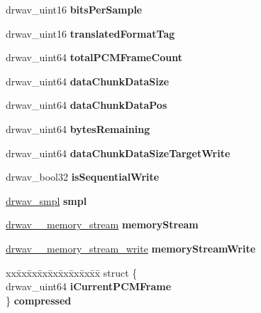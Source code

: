 \begin{DoxyCompactItemize}
drwav\+\_\+uint16 {\bfseries bits\+Per\+Sample}
\item 
\mbox{\label{structdrwav_a842f721c6cd25a490163640b5e27e67e}} 
drwav\+\_\+uint16 {\bfseries translated\+Format\+Tag}
\item 
\mbox{\label{structdrwav_ac8e8a1d641a939c0509bdb8a66756305}} 
drwav\+\_\+uint64 {\bfseries total\+P\+C\+M\+Frame\+Count}
\item 
\mbox{\label{structdrwav_a9b86f18b7e61119b7cb1508b1fa7ad81}} 
drwav\+\_\+uint64 {\bfseries data\+Chunk\+Data\+Size}
\item 
\mbox{\label{structdrwav_ac072363918628b9c86f785ef6d88989c}} 
drwav\+\_\+uint64 {\bfseries data\+Chunk\+Data\+Pos}
\item 
\mbox{\label{structdrwav_adbaabf47d5befd4198937bb6232fe2ad}} 
drwav\+\_\+uint64 {\bfseries bytes\+Remaining}
\item 
\mbox{\label{structdrwav_a18f4fc049e3c11a30675289d74058522}} 
drwav\+\_\+uint64 {\bfseries data\+Chunk\+Data\+Size\+Target\+Write}
\item 
\mbox{\label{structdrwav_a6e048af649de76096464bef56315f190}} 
drwav\+\_\+bool32 {\bfseries is\+Sequential\+Write}
\item 
\mbox{\label{structdrwav_ad59f1f3335ae2691b51444e7ed4d4f29}} 
\mbox{\hyperlink{structdrwav__smpl}{drwav\+\_\+smpl}} {\bfseries smpl}
\item 
\mbox{\label{structdrwav_a6bffd178879c0016be00a08b124fa976}} 
\mbox{\hyperlink{structdrwav____memory__stream}{drwav\+\_\+\+\_\+memory\+\_\+stream}} {\bfseries memory\+Stream}
\item 
\mbox{\label{structdrwav_a6cf469b4270d486b8940be5e2cc2f961}} 
\mbox{\hyperlink{structdrwav____memory__stream__write}{drwav\+\_\+\+\_\+memory\+\_\+stream\+\_\+write}} {\bfseries memory\+Stream\+Write}
\item 
\mbox{\label{structdrwav_a5a102055290657409660b69f6af77983}} 
\begin{tabbing}
xx\=xx\=xx\=xx\=xx\=xx\=xx\=xx\=xx\=\kill
struct \{\\
\>drwav\_uint64 {\bfseries iCurrentPCMFrame}\\
\} {\bfseries compressed}\\


\end{tabbing}
\end{DoxyCompactItemize}
